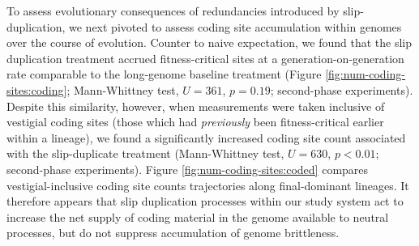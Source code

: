 To assess evolutionary consequences of redundancies introduced by slip-duplication, we next pivoted to assess coding site accumulation within genomes over the course of evolution.
Counter to naive expectation, we found that the slip duplication treatment accrued fitness-critical sites at a generation-on-generation rate comparable to the long-genome baseline treatment (Figure \ref{fig:num-coding-sites:coding}; Mann-Whittney test, $U=361$, $p=0.19$; second-phase experiments).
Despite this similarity, however, when measurements were taken inclusive of vestigial coding sites (those which had \textit{previously} been fitness-critical earlier within a lineage), we found a significantly increased coding site count associated with the slip-duplicate treatment (Mann-Whittney test, $U=630$, $p<0.01$; second-phase experiments).
Figure \ref{fig:num-coding-sites:coded} compares vestigial-inclusive coding site counts trajectories along final-dominant lineages.
It therefore appears that slip duplication processes within our study system act to increase the net supply of coding material in the genome available to neutral processes, but do not suppress accumulation of genome brittleness.


